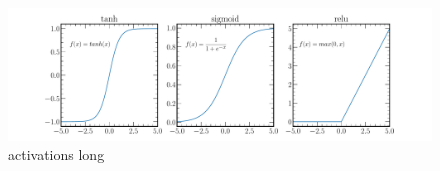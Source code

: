 \begin{figure}
    \centering
    \begin{subfigure}[b]{5cm}
        \label{fig:conv_input}
    \end{subfigure}
    \hspace{1cm}
    \begin{subfigure}[b]{5cm}
        \centering
        \label{fig:conv_kernel}
    \end{subfigure}

\end{figure}

\begin{figure}
    \includegraphics[width=\textwidth]{diagrams/6-cvn/activations.pdf}
    \caption[activations short]%
    {activations long}
    \label{fig:activations}
\end{figure}

